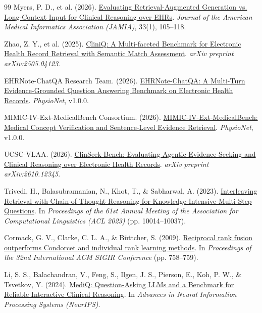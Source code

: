 \begin{thebibliography}{99}
Myers, P. D., et al. (2026).
\href{https://doi.org/10.1093/jamia/ocaf189}{Evaluating Retrieval-Augmented Generation vs. Long-Context Input for Clinical Reasoning over EHRs}.
\textit{Journal of the American Medical Informatics Association (JAMIA)}, 33(1), 105--118.

Zhao, Z. Y., et al. (2025).
\href{https://arxiv.org/abs/2505.04123}{CliniQ: A Multi-faceted Benchmark for Electronic Health Record Retrieval with Semantic Match Assessment}.
\textit{arXiv preprint arXiv:2505.04123}.

EHRNote-ChatQA Research Team. (2026).
\href{https://physionet.org/content/ehrnote-chatqa/1.0.0/}{EHRNote-ChatQA: A Multi-Turn Evidence-Grounded Question Answering Benchmark on Electronic Health Records}.
\textit{PhysioNet}, v1.0.0.

MIMIC-IV-Ext-MedicalBench Consortium. (2026).
\href{https://physionet.org/content/mimic-iv-ext-medicalbench/1.0.0/}{MIMIC-IV-Ext-MedicalBench: Medical Concept Verification and Sentence-Level Evidence Retrieval}.
\textit{PhysioNet}, v1.0.0.

UCSC-VLAA. (2026).
\href{https://arxiv.org/abs/2610.12345}{ClinSeek-Bench: Evaluating Agentic Evidence Seeking and Clinical Reasoning over Electronic Health Records}.
\textit{arXiv preprint arXiv:2610.12345}.

Trivedi, H., Balasubramanian, N., Khot, T., \& Sabharwal, A. (2023).
\href{https://arxiv.org/abs/2212.10509}{Interleaving Retrieval with Chain-of-Thought Reasoning for Knowledge-Intensive Multi-Step Questions}.
In \textit{Proceedings of the 61st Annual Meeting of the Association for Computational Linguistics (ACL 2023)} (pp. 10014--10037).

Cormack, G. V., Clarke, C. L. A., \& Büttcher, S. (2009).
\href{https://doi.org/10.1145/1571941.1572114}{Reciprocal rank fusion outperforms Condorcet and individual rank learning methods}.
In \textit{Proceedings of the 32nd International ACM SIGIR Conference} (pp. 758--759).

Li, S. S., Balachandran, V., Feng, S., Ilgen, J. S., Pierson, E., Koh, P. W., \& Tsvetkov, Y. (2024).
\href{https://arxiv.org/abs/2406.00922}{MediQ: Question-Asking LLMs and a Benchmark for Reliable Interactive Clinical Reasoning}.
In \textit{Advances in Neural Information Processing Systems (NeurIPS)}.


\end{thebibliography}
